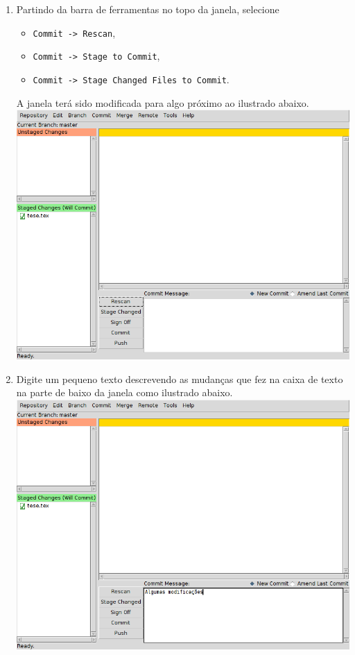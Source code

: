 \begin{enumerate}
  \item Partindo da barra de ferramentas no topo da janela, selecione
    \begin{itemize}
      \item \lstinline+Commit -> Rescan+,
      \item \lstinline+Commit -> Stage to Commit+,
      \item \lstinline+Commit -> Stage Changed Files to Commit+.
    \end{itemize}
    A janela terá sido modificada para algo próximo ao ilustrado abaixo.\\
    \includegraphics[scale=.6]{figuras/git-gui05}
  \item Digite um pequeno texto descrevendo as mudanças que fez na caixa de
    texto na parte de baixo da janela como ilustrado abaixo.\\
    \includegraphics[scale=.6]{figuras/git-gui06}

\end{enumerate}
